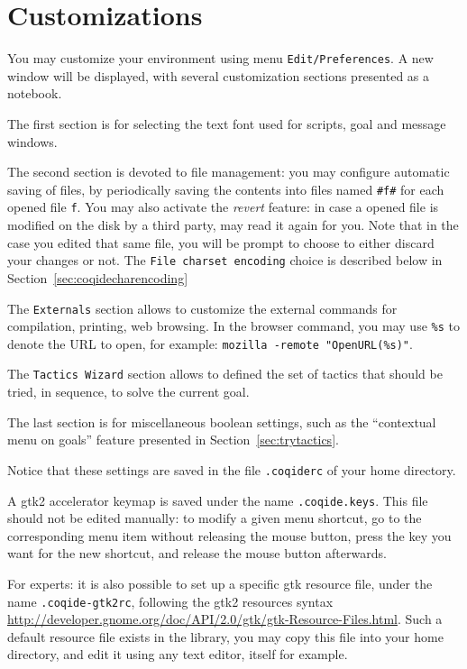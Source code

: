 \section{Customizations}

You may customize your environment using menu
\texttt{Edit/Preferences}. A new window will be displayed, with
several customization sections presented as a notebook. 

The first section is for selecting the text font used for scripts, goal
and message windows. 

The second section is devoted to file management: you may
configure automatic saving of files, by periodically saving the
contents into files named \verb|#f#| for each opened file
\verb|f|. You may also activate the \emph{revert} feature: in case a
opened file is modified on the disk by a third party, \CoqIDE{} may read
it again for you. Note that in the case you edited that same file, you
will be prompt to choose to either discard your changes or not. The
\texttt{File charset encoding} choice is described below in
Section~\ref{sec:coqidecharencoding}
 

The \verb|Externals| section allows to customize the external commands
for compilation, printing, web browsing. In the browser command, you
may use \verb|%s| to denote the URL to open, for example: %
\verb|mozilla -remote "OpenURL(%s)"|. 

The \verb|Tactics Wizard| section allows to defined the set of tactics
that should be tried, in sequence, to solve the current goal.

The last section is for miscellaneous boolean settings, such as the
``contextual menu on goals'' feature presented in
Section~\ref{sec:trytactics}. 

Notice that these settings are saved in the file \verb|.coqiderc| of
your home directory. 

A gtk2 accelerator keymap is saved under the name \verb|.coqide.keys|.
This file should not be edited manually: to modify a given menu
shortcut, go to the corresponding menu item without releasing the
mouse button, press the key you want for the new shortcut, and release
the mouse button afterwards.

For experts: it is also possible to set up a specific gtk resource
file, under the name \verb|.coqide-gtk2rc|, following the gtk2
resources syntax
\url{http://developer.gnome.org/doc/API/2.0/gtk/gtk-Resource-Files.html}.
Such a default resource file exists in the \Coq{} library, you may
copy this file into your home directory, and edit it using any text
editor, \CoqIDE{} itself for example.

